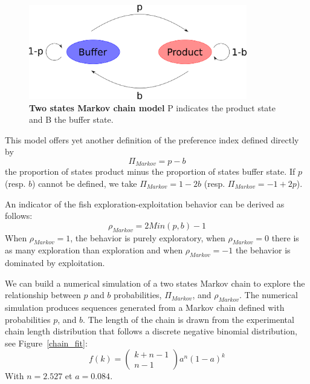   \begin{figure}[h]
    \centering
    \includegraphics[width=0.85\textwidth]{part_2/assets/model.png}
    \caption{\textbf{Two states Markov chain model} P indicates the product state and B the buffer state.}
    \label{markov_model}
  \end{figure}

  This model offers yet another definition of the preference index defined directly by
  \begin{equation}
    \Pi_{Markov} = p - b
  \end{equation}
  \noindent the proportion of states product minus the proportion of states buffer state. If $p$ (resp. $b$) cannot be defined, we take $\Pi_{Markov} = 1-2b$ (resp. $\Pi_{Markov} = -1+2p$).

 An indicator of the fish exploration-exploitation behavior can be derived as follows:
  \begin{equation}
    \rho_{Markov} = 2Min(p,b) - 1
  \end{equation}
   \noindent When $\rho_{Markov} = 1$,  the  behavior is purely exploratory, when $\rho_{Markov} = 0$ there is as many exploration than exploration and when $\rho_{Markov} = -1$ the behavior is dominated by exploitation.

  We can build a numerical simulation of a two states Markov chain to explore the relationship between $p$ and $b$ probabilities, $\Pi_{Markov}$, and $\rho_{Markov}$. The numerical simulation produces sequences generated from a Markov chain defined with probabilities $p$, and $b$. The length of the chain is drawn from the experimental chain length distribution that follows a discrete negative binomial distribution, see Figure~\ref{chain_fit}:
  \begin{equation}
    f(k) = \begin{pmatrix}
    k+n-1\\
    n-1
    \end{pmatrix}
    a^n(1-a)^k
  \end{equation}
  \noindent With $n=2.527$ et $a=0.084$.

